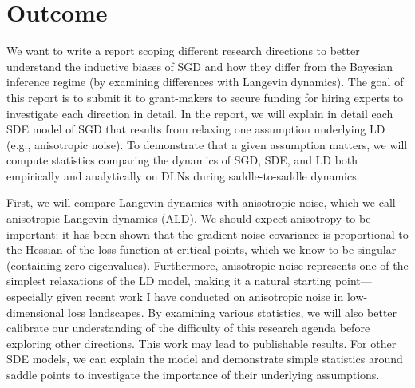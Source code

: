 \documentclass[11pt]{article}
\begin{document}
\section*{Outcome}
We want to write a report scoping different research directions to better understand the inductive biases of SGD and how they differ from the Bayesian inference regime (by examining differences with Langevin dynamics). The goal of this report is to submit it to grant-makers to secure funding for hiring experts to investigate each direction in detail. In the report, we will explain in detail each SDE model of SGD that results from relaxing one assumption underlying LD (e.g., anisotropic noise). To demonstrate that a given assumption matters, we will compute statistics comparing the dynamics of SGD, SDE, and LD both empirically and analytically on DLNs during saddle-to-saddle dynamics.

First, we will compare Langevin dynamics with anisotropic noise, which we call anisotropic Langevin dynamics (ALD). We should expect anisotropy to be important: it has been shown that the gradient noise covariance is proportional to the Hessian of the loss function at critical points, which we know to be singular (containing zero eigenvalues). Furthermore, anisotropic noise represents one of the simplest relaxations of the LD model, making it a natural starting point—especially given recent work I have conducted on anisotropic noise in low-dimensional loss landscapes. By examining various statistics, we will also better calibrate our understanding of the difficulty of this research agenda before exploring other directions. This work may lead to publishable results. For other SDE models, we can explain the model and demonstrate simple statistics around saddle points to investigate the importance of their underlying assumptions.
\end{document}
